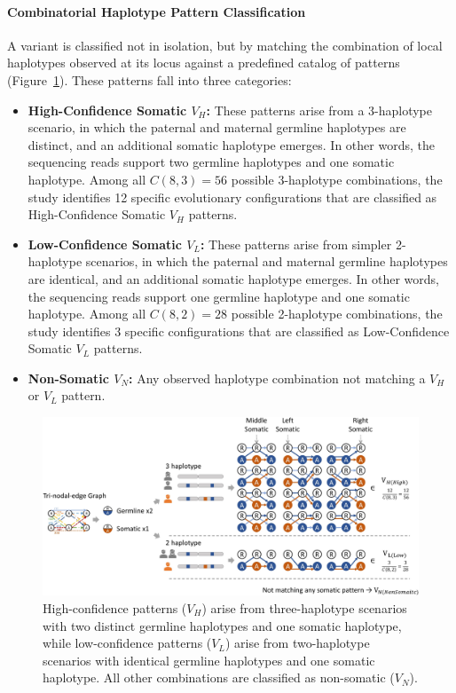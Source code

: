 \documentclass[pdflatex,sn-nature]{sn-jnl}
\def\pandocbounded#1{%
  \begingroup
  \setkeys{Gin}{width=1.0\linewidth,height=1.0\textheight,keepaspectratio}%
  #1%
  \endgroup
}
\providecommand{\tightlist}{%
  \setlength{\itemsep}{0pt}\setlength{\parskip}{0pt}}
\begin{document}
\paragraph{Combinatorial Haplotype Pattern Classification}\label{combinatorial-haplotype-pattern-classification}

A variant is classified not in isolation, but by matching the combination of local haplotypes observed at its locus against a predefined catalog of patterns (Figure~\ref{fig:met-page-21-cropped-jpg}). These patterns fall into three categories:

\begin{itemize}
\tightlist
\item
  \textbf{High-Confidence Somatic \(V_H\):} These patterns arise from a 3-haplotype scenario, in which the paternal and maternal germline haplotypes are distinct, and an additional somatic haplotype emerges. In other words, the sequencing reads support two germline haplotypes and one somatic haplotype. Among all \(C(8,3) = 56\) possible 3-haplotype combinations, the study identifies 12 specific evolutionary configurations that are classified as High-Confidence Somatic \(V_H\) patterns.
\item
  \textbf{Low-Confidence Somatic \(V_L\):} These patterns arise from simpler 2-haplotype scenarios, in which the paternal and maternal germline haplotypes are identical, and an additional somatic haplotype emerges. In other words, the sequencing reads support one germline haplotype and one somatic haplotype. Among all \(C(8,2) = 28\) possible 2-haplotype combinations, the study identifies 3 specific configurations that are classified as Low-Confidence Somatic \(V_L\) patterns.
\item
  \textbf{Non-Somatic \(V_N\):} Any observed haplotype combination not matching a \(V_H\) or \(V_L\) pattern.
\end{itemize}

\begin{figure}
\centering
\pandocbounded{\includegraphics[keepaspectratio]{page_21_cropped.jpg}}
\caption[Combinatorial Haplotype Pattern Classification]{High-confidence patterns ($V_H$) arise from three-haplotype scenarios with two distinct germline haplotypes and one somatic haplotype, while low-confidence patterns ($V_L$) arise from two-haplotype scenarios with identical germline haplotypes and one somatic haplotype. All other combinations are classified as non-somatic ($V_N$).}\label{fig:met-page-21-cropped-jpg}
\end{figure}
\end{document}
